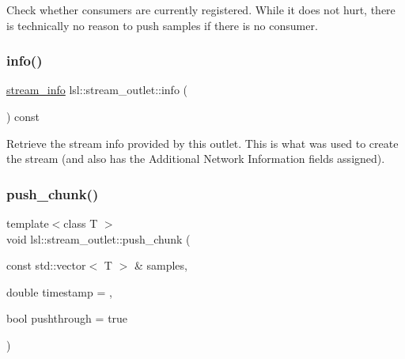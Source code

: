 Check whether consumers are currently registered. While it does not hurt, there is technically no reason to push samples if there is no consumer. \mbox{\label{classlsl_1_1stream__outlet_af6fda8eb922b27ae3ed98651934243fe}} 
\subsubsection{\texorpdfstring{info()}{info()}}
{\footnotesize\ttfamily \hyperlink{classlsl_1_1stream__info}{stream\+\_\+info} lsl\+::stream\+\_\+outlet\+::info (\begin{DoxyParamCaption}{ }\end{DoxyParamCaption}) const\hspace{0.3cm}{\ttfamily [inline]}}

Retrieve the stream info provided by this outlet. This is what was used to create the stream (and also has the Additional Network Information fields assigned). \mbox{\label{classlsl_1_1stream__outlet_a58427b98e8a60e7d160534078f3e04f8}} 
\subsubsection{\texorpdfstring{push\+\_\+chunk()}{push\_chunk()}\hspace{0.1cm}{\footnotesize\ttfamily [1/2]}}
{\footnotesize\ttfamily template$<$class T $>$ \\
void lsl\+::stream\+\_\+outlet\+::push\+\_\+chunk (\begin{DoxyParamCaption}\item[{const std\+::vector$<$ T $>$ \&}]{samples,  }\item[{double}]{timestamp = {},  }\item[{bool}]{pushthrough = {\ttfamily true} }\end{DoxyParamCaption})\hspace{0.3cm}{\ttfamily [inline]}}

